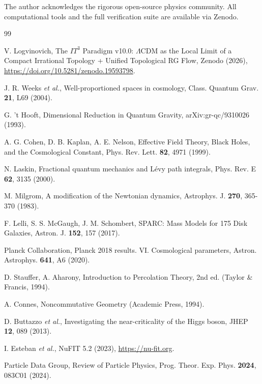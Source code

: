 \documentclass[aps,prd,twocolumn,superscriptaddress,nofootinbib]{revtex4-2}
\begin{document}
\begin{acknowledgments}
The author acknowledges the rigorous open-source physics community. All computational tools and the full verification suite are available via Zenodo.
\end{acknowledgments}

\begin{thebibliography}{99}

V. Logvinovich, The $IT^3$ Paradigm v10.0: $\Lambda$CDM as the Local Limit of a Compact Irrational Topology + Unified Topological RG Flow, Zenodo (2026), \url{https://doi.org/10.5281/zenodo.19593798}.

J. R. Weeks \textit{et al.}, Well-proportioned spaces in cosmology, Class. Quantum Grav. \textbf{21}, L69 (2004).

G. 't Hooft, Dimensional Reduction in Quantum Gravity, arXiv:gr-qc/9310026 (1993).

A. G. Cohen, D. B. Kaplan, A. E. Nelson, Effective Field Theory, Black Holes, and the Cosmological Constant, Phys. Rev. Lett. \textbf{82}, 4971 (1999).

N. Laskin, Fractional quantum mechanics and L\'evy path integrals, Phys. Rev. E \textbf{62}, 3135 (2000).

M. Milgrom, A modification of the Newtonian dynamics, Astrophys. J. \textbf{270}, 365-370 (1983).

F. Lelli, S. S. McGaugh, J. M. Schombert, SPARC: Mass Models for 175 Disk Galaxies, Astron. J. \textbf{152}, 157 (2017).

Planck Collaboration, Planck 2018 results. VI. Cosmological parameters, Astron. Astrophys. \textbf{641}, A6 (2020).

D. Stauffer, A. Aharony, Introduction to Percolation Theory, 2nd ed. (Taylor \& Francis, 1994).

A. Connes, Noncommutative Geometry (Academic Press, 1994).

D. Buttazzo \textit{et al.}, Investigating the near-criticality of the Higgs boson, JHEP \textbf{12}, 089 (2013).

I. Esteban \textit{et al.}, NuFIT 5.2 (2023), \url{https://nu-fit.org}.

Particle Data Group, Review of Particle Physics, Prog. Theor. Exp. Phys. \textbf{2024}, 083C01 (2024).

\end{thebibliography}
\end{document}
